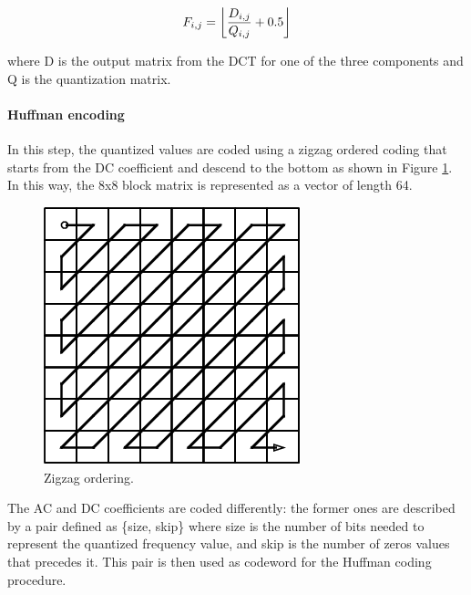 \documentclass[14pt,a4paper]{extarticle}
\DeclarePairedDelimiter\floor{\lfloor}{\rfloor}
\begin{document}
\begin{equation}
F_{i, j} = \floor*{\frac{D_{i, j}}{Q_{i, j}} + 0.5}
\end{equation}

where D is the output matrix from the DCT for one of the three components and Q is the quantization matrix.\\

\paragraph{Huffman encoding}
In this step, the quantized values are coded using a zigzag ordered coding that starts from the DC coefficient and descend to the bottom as shown in Figure \ref{fig:zigzag}. 
In this way, the 8x8 block matrix is represented as a vector of length 64.

\begin{figure}
\includegraphics[width=0.95\linewidth, center]{pics/zigzag.png} 
\caption{Zigzag ordering.}
\label{fig:zigzag}
\end{figure}

The AC and DC coefficients are coded differently: the former ones are described by a pair defined as \{size, skip\} where size is the number of bits needed to represent the quantized frequency value, and skip is the number of zeros values that precedes it. This pair is then used as codeword for the Huffman coding procedure.
\end{document}
